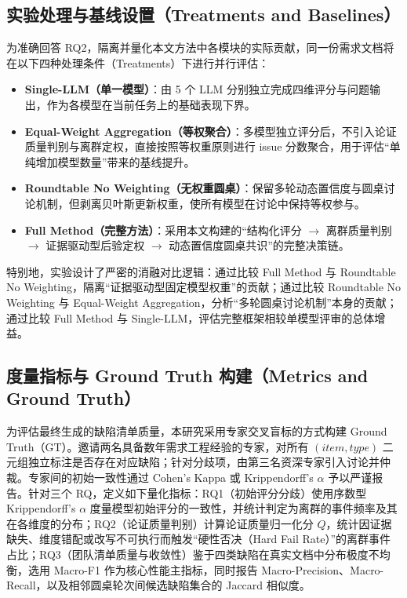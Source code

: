 \documentclass[a4paper,11pt]{ctexart}
\begin{document}
\subsection{实验处理与基线设置（Treatments and Baselines）}
\label{sec:treatments}
为准确回答 RQ2，隔离并量化本文方法中各模块的实际贡献，同一份需求文档将在以下四种处理条件（Treatments）下进行并行评估：
\begin{itemize}
\item \textbf{Single-LLM（单一模型）}：由 5 个 LLM 分别独立完成四维评分与问题输出，作为各模型在当前任务上的基础表现下界。
\item \textbf{Equal-Weight Aggregation（等权聚合）}：多模型独立评分后，不引入论证质量判别与离群定权，直接按照等权重原则进行 issue 分数聚合，用于评估“单纯增加模型数量”带来的基线提升。
\item \textbf{Roundtable No Weighting（无权重圆桌）}：保留多轮动态置信度与圆桌讨论机制，但剥离贝叶斯更新权重，使所有模型在讨论中保持等权参与。
\item \textbf{Full Method（完整方法）}：采用本文构建的“结构化评分 $\to$ 离群质量判别 $\to$ 证据驱动型后验定权 $\to$ 动态置信度圆桌共识”的完整决策链。
\end{itemize}
特别地，实验设计了严密的消融对比逻辑：通过比较 Full Method 与 Roundtable No Weighting，隔离“证据驱动型固定模型权重”的贡献；通过比较 Roundtable No Weighting 与 Equal-Weight Aggregation，分析“多轮圆桌讨论机制”本身的贡献；通过比较 Full Method 与 Single-LLM，评估完整框架相较单模型评审的总体增益。



\subsection{度量指标与 Ground Truth 构建（Metrics and Ground Truth）}
\label{sec:metrics}
为评估最终生成的缺陷清单质量，本研究采用专家交叉盲标的方式构建 Ground Truth（GT）。邀请两名具备数年需求工程经验的专家，对所有 $(item, type)$ 二元组独立标注是否存在对应缺陷；针对分歧项，由第三名资深专家引入讨论并仲裁。专家间的初始一致性通过 Cohen's Kappa 或 Krippendorff's $\alpha$ 予以严谨报告。针对三个 RQ，定义如下量化指标：RQ1（初始评分分歧）使用序数型 Krippendorff's $\alpha$ 度量模型初始评分的一致性，并统计判定为离群的事件频率及其在各维度的分布；RQ2（论证质量判别）计算论证质量归一化分 $Q$，统计因证据缺失、维度错配或改写不可执行而触发“硬性否决（Hard Fail Rate）”的离群事件占比；RQ3（团队清单质量与收敛性）鉴于四类缺陷在真实文档中分布极度不均衡，选用 Macro-F1 作为核心性能主指标，同时报告 Macro-Precision、Macro-Recall，以及相邻圆桌轮次间候选缺陷集合的 Jaccard 相似度。
\end{document}
